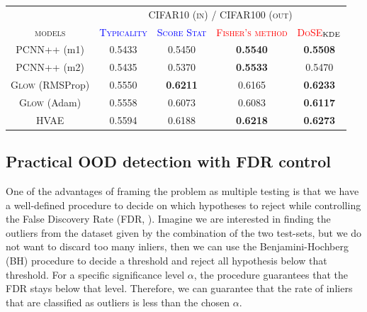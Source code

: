 {\begin{table}[t]
{\begin{tabular}{ccccc}
            \toprule
            &\multicolumn{4}{c}{\textsc{CIFAR10 (in) / CIFAR100 (out)}}\\
            \cmidrule{2-5}
            \textsc{models}  & \textcolor{blue}{\textsc{Typicality}} & \textcolor{blue}{\textsc{Score Stat}} & \textcolor{red}{\textsc{Fisher's method}} & \textcolor{red}{\textsc{DoSE$_{\textup{KDE}}$}} \\
            \midrule
            \textsc{PCNN++} (m1) &  0.5433 & 0.5450 &  \textbf{0.5540} &  \textbf{0.5508}\\
            \textsc{PCNN++} (m2) &  0.5435 &  0.5370 &  \textbf{0.5533} & 0.5470 \\
            \textsc{Glow} (RMSProp)  & 0.5550 &  \textbf{0.6211}  & 0.6165 &  \textbf{0.6233}\\
            \textsc{Glow} (Adam) & 0.5558  &   0.6073 & 0.6083 &   \textbf{0.6117}\\
            \textsc{HVAE} & 0.5594  & 0.6188  &  \textbf{0.6218} & \textbf{0.6273} \\
            \bottomrule
        \end{tabular}
        \label{tab_modelagnostic:two_sample_results}
    }
    \vspace*{-\baselineskip}
\end{table}


\subsection{Practical OOD detection with FDR control}
One of the advantages of framing the problem as multiple testing is that we have a well-defined procedure to decide on which hypotheses to reject while controlling the False Discovery Rate (FDR, \citealp{benjamini_controlling_1995}). Imagine we are interested in finding the outliers from the dataset given by the combination of the two test-sets, but we do not want to discard too many inliers, then we can use the Benjamini-Hochberg (BH) procedure \parencite{benjamini_controlling_1995} to decide a threshold and reject all hypothesis below that threshold. For a specific significance level $\alpha$, the procedure guarantees that the FDR stays below that level. Therefore, we can guarantee that the rate of inliers that are classified as outliers is less than the chosen $\alpha$.


}
